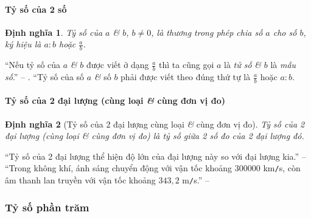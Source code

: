 \documentclass{article}
\numberwithin{equation}{section}
\newtheorem{dinhnghia}{Định nghĩa}[section]
\begin{document}
\paragraph{Tỷ số của 2 số}
\begin{dinhnghia}
	 \emph{Tỷ số} của $a$ \textit{\&} $b$, $b\ne 0$, là thương trong phép chia số $a$ cho số $b$, ký hiệu là $a:b$ hoặc $\frac{a}{b}$.
\end{dinhnghia}
``Nếu tỷ số của $a$ \textit{\&} $b$ được viết ở dạng $\frac{a}{b}$ thì ta cũng gọi $a$ là \textit{tử số} \textit{\&} $b$ là \textit{mẫu số}.'' -- \cite[p. 61]{SGK_Toan_6_Canh_Dieu_tap_2}. ``Tỷ số của số $a$ \textit{\&} số $b$ phải được viết theo đúng thứ tự là $\frac{a}{b}$ hoặc $a:b$.

\paragraph{Tỷ số của 2 đại lượng (cùng loại \textit{\&} cùng đơn vị đo)}
\begin{dinhnghia}[Tỷ số của 2 đại lượng cùng loại \textit{\&} cùng đơn vị đo]
	\emph{Tỷ số của 2 đại lượng (cùng loại \textit{\&} cùng đơn vị đo)} là tỷ số giữa 2 số đo của 2 đại lượng đó.
\end{dinhnghia}
``Tỷ số của 2 đại lượng thể hiện độ lớn của đại lượng này so với đại lượng kia.'' -- \cite[p. 62]{SGK_Toan_6_Canh_Dieu_tap_2} ``Trong không khí, ánh sáng chuyển động với vận tốc khoảng $300 000$ km\texttt{/}s, còn âm thanh lan truyền với vận tốc khoảng $343,2$ m\texttt{/}s.'' -- \cite[p. 63]{SGK_Toan_6_Canh_Dieu_tap_2}

\subsubsection{Tỷ số phần trăm}
\end{document}

